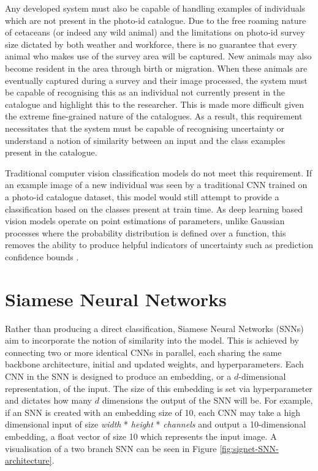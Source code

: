 Any developed system must also be capable of handling examples of individuals which are not present in the photo-id catalogue. Due to the free roaming nature of cetaceans (or indeed any wild animal) and the limitations on photo-id survey size dictated by both weather and workforce, there is no guarantee that every animal who makes use of the survey area will be captured. New animals may also become resident in the area through birth or migration. When these animals are eventually captured during a survey and their image processed, the system must be capable of recognising this as an individual not currently present in the catalogue and highlight this to the researcher. This is made more difficult given the extreme fine-grained nature of the catalogues. As a result, this requirement necessitates that the system must be capable of recognising uncertainty or understand a notion of similarity between an input and the class examples present in the catalogue. 

Traditional computer vision classification models do not meet this requirement. If an example image of a new individual was seen by a traditional CNN trained on a photo-id catalogue dataset, this model would still attempt to provide a classification based on the classes present at train time.  As deep learning based vision models operate on point estimations of parameters, unlike Gaussian processes where the probability distribution is defined over a function, this removes the ability to produce helpful indicators of uncertainty such as prediction confidence bounds \cite{gal_uncertainty_2016}. 

\section{Siamese Neural Networks}\label{ch:ID,sec:deciding,sub:SNN}

Rather than producing a direct classification, Siamese Neural Networks (SNNs) aim to incorporate the notion of similarity into the model. This is achieved by connecting two or more identical CNNs in parallel, each sharing the same backbone architecture, initial and updated weights, and hyperparameters. Each CNN in the SNN is designed to produce an embedding, or a $d$-dimensional representation, of the input. The size of this embedding is set via hyperparameter and dictates how many $d$ dimensions the output of the SNN will be. For example, if an SNN is created with an embedding size of 10, each CNN may take a high dimensional input of size \textit{width} * \textit{height} * \textit{channels} and output a 10-dimensional embedding, a float vector of size 10 which represents the input image. A visualisation of a two branch SNN can be seen in Figure \ref{fig:signet-SNN-architecture}.

